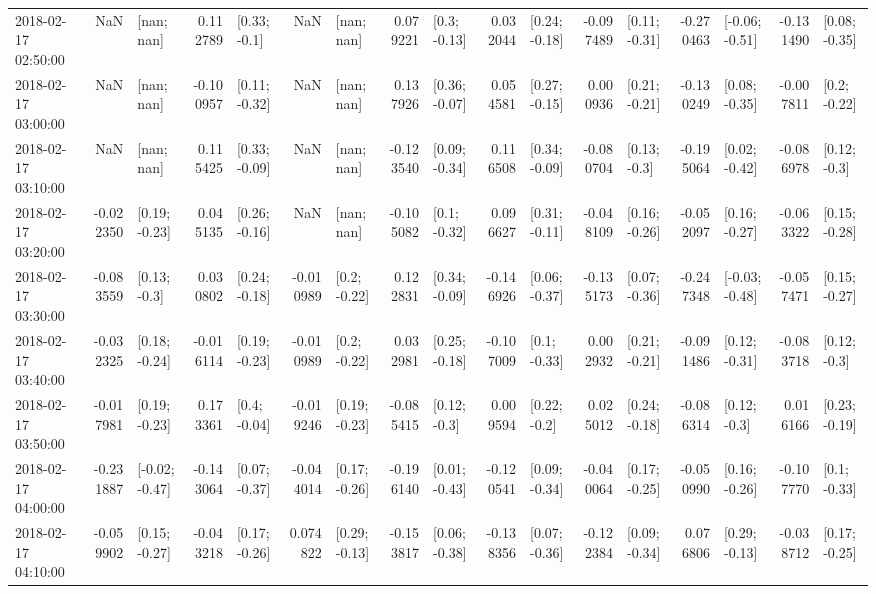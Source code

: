 \begin{tabular}{lrlrlrlrlrlrlrlrl}
2018-02-17 02:50:00 &       NaN &      [nan; nan] &  0.112789 &    [0.33; -0.1] &       NaN &      [nan; nan] &  0.079221 &    [0.3; -0.13] &  0.032044 &   [0.24; -0.18] & -0.097489 &   [0.11; -0.31] & -0.270463 &  [-0.06; -0.51] & -0.131490 &   [0.08; -0.35] \\
2018-02-17 03:00:00 &       NaN &      [nan; nan] & -0.100957 &   [0.11; -0.32] &       NaN &      [nan; nan] &  0.137926 &   [0.36; -0.07] &  0.054581 &   [0.27; -0.15] &  0.000936 &   [0.21; -0.21] & -0.130249 &   [0.08; -0.35] & -0.007811 &    [0.2; -0.22] \\
2018-02-17 03:10:00 &       NaN &      [nan; nan] &  0.115425 &   [0.33; -0.09] &       NaN &      [nan; nan] & -0.123540 &   [0.09; -0.34] &  0.116508 &   [0.34; -0.09] & -0.080704 &    [0.13; -0.3] & -0.195064 &   [0.02; -0.42] & -0.086978 &    [0.12; -0.3] \\
2018-02-17 03:20:00 & -0.022350 &   [0.19; -0.23] &  0.045135 &   [0.26; -0.16] &       NaN &      [nan; nan] & -0.105082 &    [0.1; -0.32] &  0.096627 &   [0.31; -0.11] & -0.048109 &   [0.16; -0.26] & -0.052097 &   [0.16; -0.27] & -0.063322 &   [0.15; -0.28] \\
2018-02-17 03:30:00 & -0.083559 &    [0.13; -0.3] &  0.030802 &   [0.24; -0.18] & -0.010989 &    [0.2; -0.22] &  0.122831 &   [0.34; -0.09] & -0.146926 &   [0.06; -0.37] & -0.135173 &   [0.07; -0.36] & -0.247348 &  [-0.03; -0.48] & -0.057471 &   [0.15; -0.27] \\
2018-02-17 03:40:00 & -0.032325 &   [0.18; -0.24] & -0.016114 &   [0.19; -0.23] & -0.010989 &    [0.2; -0.22] &  0.032981 &   [0.25; -0.18] & -0.107009 &    [0.1; -0.33] &  0.002932 &   [0.21; -0.21] & -0.091486 &   [0.12; -0.31] & -0.083718 &    [0.12; -0.3] \\
2018-02-17 03:50:00 & -0.017981 &   [0.19; -0.23] &  0.173361 &    [0.4; -0.04] & -0.019246 &   [0.19; -0.23] & -0.085415 &    [0.12; -0.3] &  0.009594 &    [0.22; -0.2] &  0.025012 &   [0.24; -0.18] & -0.086314 &    [0.12; -0.3] &  0.016166 &   [0.23; -0.19] \\
2018-02-17 04:00:00 & -0.231887 &  [-0.02; -0.47] & -0.143064 &   [0.07; -0.37] & -0.044014 &   [0.17; -0.26] & -0.196140 &   [0.01; -0.43] & -0.120541 &   [0.09; -0.34] & -0.040064 &   [0.17; -0.25] & -0.050990 &   [0.16; -0.26] & -0.107770 &    [0.1; -0.33] \\
2018-02-17 04:10:00 & -0.059902 &   [0.15; -0.27] & -0.043218 &   [0.17; -0.26] &  0.074822 &   [0.29; -0.13] & -0.153817 &   [0.06; -0.38] & -0.138356 &   [0.07; -0.36] & -0.122384 &   [0.09; -0.34] &  0.076806 &   [0.29; -0.13] & -0.038712 &   [0.17; -0.25] \\

\end{tabular}
